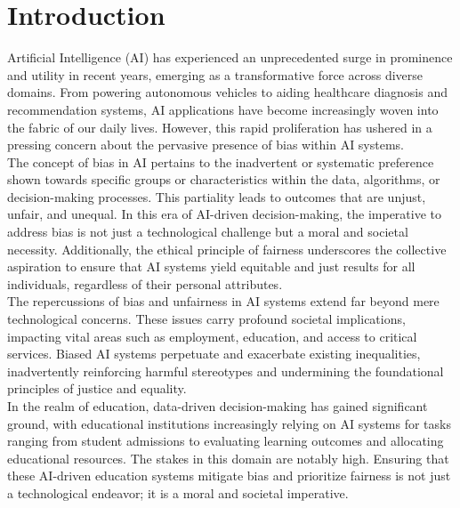 \documentclass[12pt,a4paper,openright,twoside]{book}
\begin{document}
\mainmatter

\chapter{Introduction}
\label{chap:introduction}

Artificial Intelligence (AI) has experienced an unprecedented surge in prominence and utility in recent years, emerging as a transformative force across diverse domains. From powering autonomous vehicles to aiding healthcare diagnosis and recommendation systems, AI applications have become increasingly woven into the fabric of our daily lives. However, this rapid proliferation has ushered in a pressing concern about the pervasive presence of bias within AI systems. \\
The concept of bias in AI pertains to the inadvertent or systematic preference shown towards specific groups or characteristics within the data, algorithms, or decision-making processes. This partiality leads to outcomes that are unjust, unfair, and unequal. In this era of AI-driven decision-making, the imperative to address bias is not just a technological challenge but a moral and societal necessity. Additionally, the ethical principle of fairness underscores the collective aspiration to ensure that AI systems yield equitable and just results for all individuals, regardless of their personal attributes. \\
The repercussions of bias and unfairness in AI systems extend far beyond mere technological concerns. These issues carry profound societal implications, impacting vital areas such as employment, education, and access to critical services. Biased AI systems perpetuate and exacerbate existing inequalities, inadvertently reinforcing harmful stereotypes and undermining the foundational principles of justice and equality. \\
In the realm of education, data-driven decision-making has gained significant ground, with educational institutions increasingly relying on AI systems for tasks ranging from student admissions to evaluating learning outcomes and allocating educational resources. The stakes in this domain are notably high. Ensuring that these AI-driven education systems mitigate bias and prioritize fairness is not just a technological endeavor; it is a moral and societal imperative. \\
\end{document}
